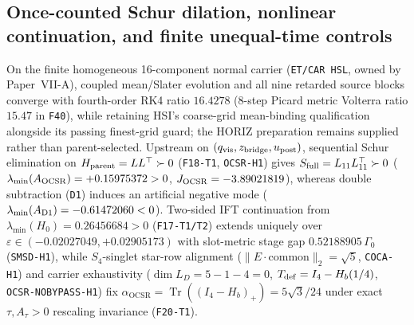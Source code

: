 \documentclass[11pt]{article}
\newcommand{\Tr}{\operatorname{Tr}}
\begin{document}
\subsection{Once-counted Schur dilation, nonlinear continuation, and finite unequal-time controls}
\label{sec:etcar-chain-20261110}
\label{sec:foundations-f17-f20-paperiv-20261112}\hypertarget{f17f20paperiv}{}
On the finite homogeneous 16-component normal carrier (\texttt{ET/CAR HSL}, owned by Paper~VII-A), coupled mean/Slater evolution and all nine retarded source blocks converge with fourth-order RK4 ratio $16.4278$ ($8$-step Picard metric Volterra ratio $15.47$ in \texttt{F40}), while retaining HSI's coarse-grid mean-binding qualification alongside its passing finest-grid guard; the HORIZ preparation remains supplied rather than parent-selected. Upstream on $(q_{\rm vis},z_{\rm bridge},u_{\rm post})$, sequential Schur elimination on $H_{\rm parent}=LL^\top\succ 0$ (\texttt{F18-T1}, \texttt{OCSR-H1}) gives $S_{\rm full}=L_{11}L_{11}^\top\succ 0$ ($\lambda_{\min}(A_{\rm OCSR})=+0.15975372>0$, $J_{\rm OCSR}=-3.89021819$), whereas double subtraction (\texttt{D1}) induces an artificial negative mode ($\lambda_{\min}(A_{\rm D1})=-0.61472060<0$). Two-sided IFT continuation from $\lambda_{\min}(H_0)=0.26456684>0$ (\texttt{F17-T1/T2}) extends uniquely over $\varepsilon\in(-0.02027049,+0.02905173)$ with slot-metric stage gap $0.52188905\,\Gamma_0$ (\texttt{SMSD-H1}), while $S_4$-singlet star-row alignment ($\|E\cdot\text{common}\|_2=\sqrt{5}$, \texttt{COCA-H1}) and carrier exhaustivity ($\dim L_D=5-1-4=0$, $T_{\rm def}=I_4-H_b(1/4)$, \texttt{OCSR-NOBYPASS-H1}) fix $\alpha_{\mathrm{OCSR}}=\Tr((I_4-H_b)_+)=5\sqrt{3}/24$ under exact $\tau,A_\tau>0$ rescaling invariance (\texttt{F20-T1}).
\end{document}
